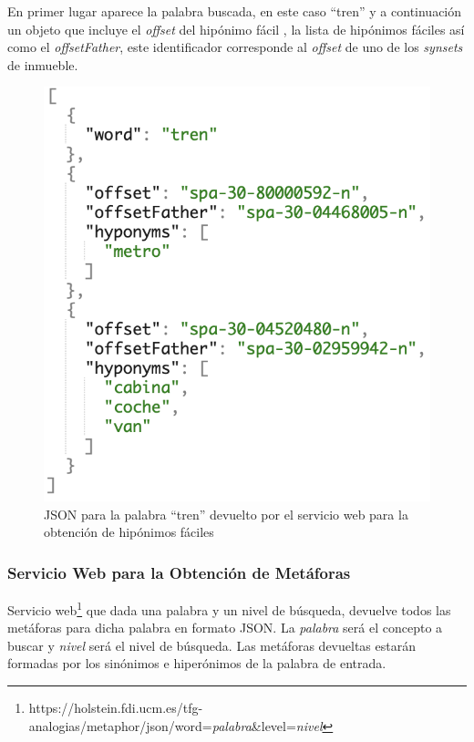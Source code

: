 En primer lugar aparece la palabra buscada, en este caso ``tren'' y a continuación un objeto que incluye el \textit{offset} del hipónimo fácil , la lista de hipónimos fáciles así como el \textit{offsetFather}, este identificador corresponde al \textit{offset} de uno de los \textit{synsets} de inmueble. 

\begin{figure}[!h]
	\includegraphics[width=.6\textwidth]{Imagenes/Bitmap/Capitulo4/JSON-SW/peticionGetEasyHyponym.png}
	\centering
	\caption{JSON para la palabra ``tren'' devuelto por el servicio web para la obtención de hipónimos fáciles}
	\label{fig:peticionGetEasyHyponym}
\end{figure}


\subsubsection{Servicio Web para la Obtención de Metáforas}
\label{cap:subsec:sw_metaforas}
Servicio web\footnote{https://holstein.fdi.ucm.es/tfg-analogias/metaphor/json/word=\textit{palabra}\&level=\textit{nivel}} que dada una palabra y un nivel de búsqueda, devuelve todos las metáforas para dicha palabra en formato JSON. La \textit{palabra} será el concepto a buscar y \textit{nivel} será el nivel de búsqueda.
Las metáforas devueltas estarán formadas por los sinónimos e hiperónimos de la palabra de entrada.

